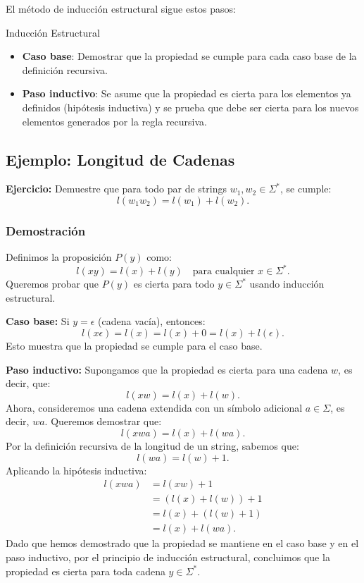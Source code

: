 El método de inducción estructural sigue estos pasos:
\begin{definitionblock}{Inducción Estructural}
\begin{itemize}
    \item \textbf{Caso base}:  Demostrar que la propiedad se cumple para cada caso base de
la definición recursiva.
    \item \textbf{Paso inductivo}: Se asume que la propiedad es cierta para los elementos ya definidos (hipótesis inductiva) y se prueba que debe ser cierta para los nuevos elementos generados por la regla recursiva.
\end{itemize}
\end{definitionblock}

\subsection{Ejemplo: Longitud de Cadenas}

\textbf{Ejercicio:} Demuestre que para todo par de strings $w_1, w_2 \in \Sigma^*$, se cumple:
\[
    l(w_1 w_2) = l(w_1) + l(w_2).
\]

\subsubsection*{Demostración}
\noindent Definimos la proposición $P(y)$ como:
\[
    l(x y) = l(x) + l(y) \quad \text{para cualquier } x \in \Sigma^*.
\]
Queremos probar que $P(y)$ es cierta para todo $y \in \Sigma^*$ usando inducción estructural.

\noindent \textbf{Caso base:} Si $y = \epsilon$ (cadena vacía), entonces:
\[
    l(x \epsilon) = l(x) = l(x) + 0 = l(x) + l(\epsilon).
\]
Esto muestra que la propiedad se cumple para el caso base.

\noindent \textbf{Paso inductivo:} Supongamos que la propiedad es cierta para una cadena $w$, es decir, que:
\[
    l(x w) = l(x) + l(w).
\]
Ahora, consideremos una cadena extendida con un símbolo adicional $a \in \Sigma$, es decir, $w a$. Queremos demostrar que:
\[
    l(x w a) = l(x) + l(w a).
\]
Por la definición recursiva de la longitud de un string, sabemos que:
\[
    l(w a) = l(w) + 1.
\]
Aplicando la hipótesis inductiva:
\begin{align*}
    l(x w a) &= l(x w) + 1 \\
    &= (l(x) + l(w)) + 1 \\
    &= l(x) + (l(w) + 1) \\
    &= l(x) + l(w a).
\end{align*}
Dado que hemos demostrado que la propiedad se mantiene en el caso base y en el paso inductivo, por el principio de inducción estructural, concluimos que la propiedad es cierta para toda cadena $y \in \Sigma^*$.

